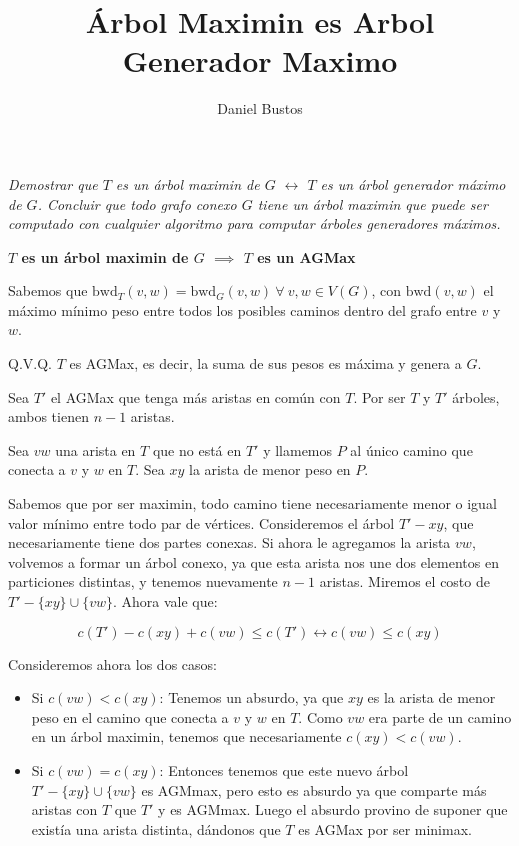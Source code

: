 \documentclass{article}
\title{Árbol Maximin es Arbol Generador Maximo}
\author{Daniel Bustos}
\begin{document}
\maketitle

\textit{Demostrar que \(T\) es un árbol maximin de \(G\) $\leftrightarrow$ \(T\) es un árbol
generador máximo de \(G\). Concluir que todo grafo conexo \(G\) tiene un árbol maximin que puede
ser computado con cualquier algoritmo para computar árboles generadores máximos.}

\textbf{\(T\) es un árbol maximin de \(G\) \(\implies\) \(T\) es un AGMax}

Sabemos que \( \text{bwd}_T(v,w) = \text{bwd}_G(v,w) \ \forall \ v,w \in V(G)\), con \(\text{bwd}(v,w)\) el máximo mínimo peso entre todos los posibles caminos dentro del grafo entre \(v\) y \(w\).

Q.V.Q. \(T\) es AGMax, es decir, la suma de sus pesos es máxima y genera a \(G\).

Sea \(T'\) el AGMax que tenga más aristas en común con \(T\). Por ser \(T\) y \(T'\) árboles, ambos tienen \(n-1\) aristas.

Sea $vw$ una arista en $T$ que no está en $T'$ y llamemos $P$ al único camino que conecta a $v$ y $w$ en $T$. Sea $xy$ la arista de menor peso en $P$. 

Sabemos que por ser maximin, todo camino tiene necesariamente menor o igual valor mínimo entre todo par de vértices. Consideremos el árbol $T'-xy$, que necesariamente tiene dos partes conexas. Si ahora le agregamos la arista $vw$, volvemos a formar un árbol conexo, ya que esta arista nos une dos elementos en particiones distintas, y tenemos nuevamente $n-1$ aristas. Miremos el costo de $T'-\{xy\} \cup \{vw\}$. Ahora vale que:

\[
c(T') - c(xy) + c(vw) \leq c(T') \leftrightarrow c(vw) \leq c(xy)
\]

Consideremos ahora los dos casos:

\begin{itemize}
    \item Si $c(vw) < c(xy)$: Tenemos un absurdo, ya que $xy$ es la arista de menor peso en el camino que conecta a $v$ y $w$ en $T$. Como $vw$ era parte de un camino en un árbol maximin, tenemos que necesariamente $c(xy) < c(vw)$.
    \item Si $c(vw) = c(xy)$: Entonces tenemos que este nuevo árbol $T'-\{xy\} \cup \{vw\}$ es AGMmax, pero esto es absurdo ya que comparte más aristas con $T$ que $T'$ y es AGMmax. Luego el absurdo provino de suponer que existía una arista distinta, dándonos que $T$ es AGMax por ser minimax.
\end{itemize}
\end{document}
